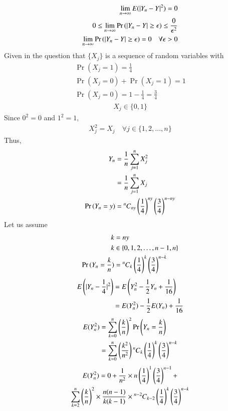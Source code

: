 \documentclass[journal,12pt,twocolumn]{IEEEtran}
\begin{document}
\begin{align}
    \lim_{n\rightarrow \infty} E(\abs{Y_n-Y}^2) = 0 
    \\0 \leq  \lim_{n\rightarrow \infty}\Pr{(\abs{Y_n-Y}\geq \epsilon)}  \leq \frac{0}{\epsilon^2}
    \\   \lim_{n\rightarrow \infty}\Pr{(\abs{Y_n-Y}\geq \epsilon)} = 0 \quad \forall \epsilon >0
\end{align}
Given in the question that $\{X_j\}$ is a sequence of random variables with
\begin{align}
    \Pr{(X_j=1)} = \frac{1}{4}
    \\\Pr{(X_j=0)} + \Pr{(X_j=1)} = 1
    \\\Pr{(X_j=0)} = 1 - \frac{1}{4} = \frac{3}{4}
\end{align}
\begin{align}
    X_j \in \{0,1\} 
\end{align}
Since $0^2 = 0$ and $1^2 = 1$, 
\begin{align}
    X_j^2 = X_j \quad \forall j \in \{1, 2,\hdots, n\}
\end{align}
Thus, 
\begin{align}
    Y_n &= \frac{1}{n} \sum_{j=1}^{n}X_j^2 
    \\&= \frac{1}{n} \sum_{j=1}^{n}X_j
    \\\Pr{(Y_n = y)} &= \comb[n]{ny} \brak{\frac{1}{4}}^{ny} \brak{\frac{3}{4}}^{n-ny}
\end{align}
Let us assume
\begin{align}
    k &= ny
    \\k &\in \{0,1,2,\hdots,n-1,n\}
    \\ \Pr{(Y_n = \frac{k}{n})} &= \comb[n]{k} \brak{\frac{1}{4}}^{k} \brak{\frac{3}{4}}^{n-k}
\end{align}
\begin{align}
    E\brak{\abs{Y_n-\frac{1}{4}}^2} &= E\brak{Y_n^2 - \frac{1}{2}Y_n + \frac{1}{16}}
    \\&= E(Y_n^2) - \frac{1}{2}E(Y_n) + \frac{1}{16} \label{equation 0}
\end{align}
\begin{align}
    E(Y_n^2) &= \sum_{k=0}^n\brak{\frac{k}{n}}^2\Pr{\brak{Y_n=\frac{k}{n}}}
    \\&= \sum_{k=0}^{n} \brak{\frac{k^2}{n^2}}\comb[n]{k} \brak{\frac{1}{4}}^{k} \brak{\frac{3}{4}}^{n-k}
\end{align}
\begin{multline}
    E(Y_n^2) = 0 + \frac{1}{n^2}\times n\brak{\frac{1}{4}}^{1} \brak{\frac{3}{4}}^{n-1} + \\\sum_{k=2}^{n} \brak{\frac{k}{n}}^2\times\frac{n(n-1)}{k(k-1)}
    \times\comb[n-2]{k-2}\brak{\frac{1}{4}}^{k} \brak{\frac{3}{4}}^{n-k}
\end{multline}
\end{document}

